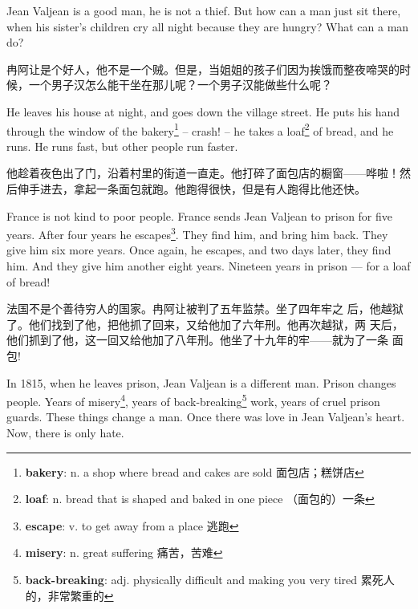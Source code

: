 \documentclass[fontset=ubuntu, zihao=5]{ctexart}
\begin{document}
\begin{paracol}{2}
  \switchcolumn*

  Jean Valjean is a good man, he is not a thief. But how can a man just sit there, when his sister's children cry all night because they are hungry? What can a man do?

  \switchcolumn

  冉阿让是个好人，他不是一个贼。但是，当姐姐的孩子们因为挨饿而整夜啼哭的时候，一个男子汉怎么能干坐在那儿呢？一个男子汉能做些什么呢？

  \switchcolumn

  He leaves his house at night, and goes down the village street. He puts his hand through the window of the bakery\footnote{\textbf{bakery}: n. a shop where bread and cakes are sold 面包店；糕饼店} – crash! – he takes a loaf\footnote{\textbf{loaf}: n. bread that is shaped and baked in one piece （面包的）一条} of bread, and he runs. He runs fast, but other people run faster.

  \switchcolumn

  他趁着夜色出了门，沿着村里的街道一直走。他打碎了面包店的橱窗——哗啦！然后伸手进去，拿起一条面包就跑。他跑得很快，但是有人跑得比他还快。

  \switchcolumn*

  France is not kind to poor people. France sends Jean Valjean to prison for five years. After four years he escapes\footnote{\textbf{escape}: v. to get away from a place 逃跑}. They find him, and bring him back. They give him six more years. Once again, he escapes, and two days later, they find him. And they give him another eight years. Nineteen years in prison --- for a loaf of bread!

  \switchcolumn

  法国不是个善待穷人的国家。冉阿让被判了五年监禁。坐了四年牢之
  后，他越狱了。他们找到了他，把他抓了回来，又给他加了六年刑。他再次越狱，两
  天后，他们抓到了他，这一回又给他加了八年刑。他坐了十九年的牢——就为了一条
  面包!

  \switchcolumn*

  In 1815, when he leaves prison, Jean Valjean is a different man.
  Prison changes people. Years of misery\footnote{\textbf{misery}: n. great suffering 痛苦，苦难}, years of back-breaking\footnote{\textbf{back-breaking}: adj. physically difficult and making you very tired 累死人的，非常繁重的} work, years
  of cruel prison guards. These things change a man. Once there was love in
  Jean Valjean's heart. Now, there is only hate.

  \switchcolumn


\end{paracol}
\end{document}

